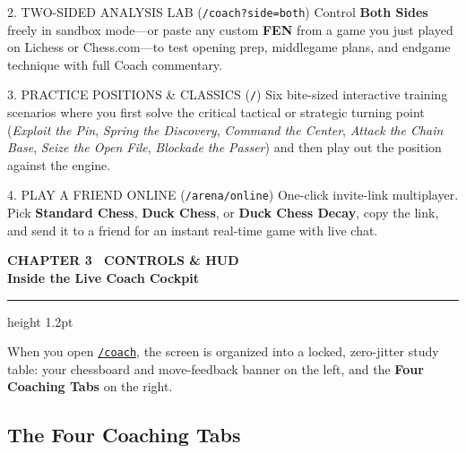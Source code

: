 \documentclass[10pt,twoside]{article}
\newcommand{\manualsection}[2]{%
  \vspace{2pt}
  {\noindent\sffamily\bfseries\scriptsize\textcolor{brand}{#1}}\\[3pt]
  {\noindent\Large\bfseries\textcolor{ink}{#2}}\\[3pt]
  {\color{ink}\hrule height 1.2pt}
  \vspace{4pt}
}
\begin{document}
\begin{manualbox}{2. TWO-SIDED ANALYSIS LAB (\texttt{/coach?side=both})}
\footnotesize
Control \textbf{Both Sides} freely in sandbox mode---or paste any custom \textbf{FEN} from a game you just played on Lichess or Chess.com---to test opening prep, middlegame plans, and endgame technique with full Coach commentary.
\end{manualbox}

\begin{manualbox}{3. PRACTICE POSITIONS \& CLASSICS (\texttt{/})}
\footnotesize
Six bite-sized interactive training scenarios where you first solve the critical tactical or strategic turning point (\emph{Exploit the Pin}, \emph{Spring the Discovery}, \emph{Command the Center}, \emph{Attack the Chain Base}, \emph{Seize the Open File}, \emph{Blockade the Passer}) and then play out the position against the engine.
\end{manualbox}

\begin{manualbox}{4. PLAY A FRIEND ONLINE (\texttt{/arena/online})}
\footnotesize
One-click invite-link multiplayer. Pick \textbf{Standard Chess}, \textbf{Duck Chess}, or \textbf{Duck Chess Decay}, copy the link, and send it to a friend for an instant real-time game with live chat.
\end{manualbox}

\newpage

\manualsection{CHAPTER 3 \textbar\ CONTROLS \& HUD}{Inside the Live Coach Cockpit}

When you open \href{https://andystats.github.io/chess-academy/coach}{\texttt{/coach}}, the screen is organized into a locked, zero-jitter study table: your chessboard and move-feedback banner on the left, and the \textbf{Four Coaching Tabs} on the right.

\subsection*{\sffamily\normalsize\textcolor{brand}{The Four Coaching Tabs}}
\end{document}
